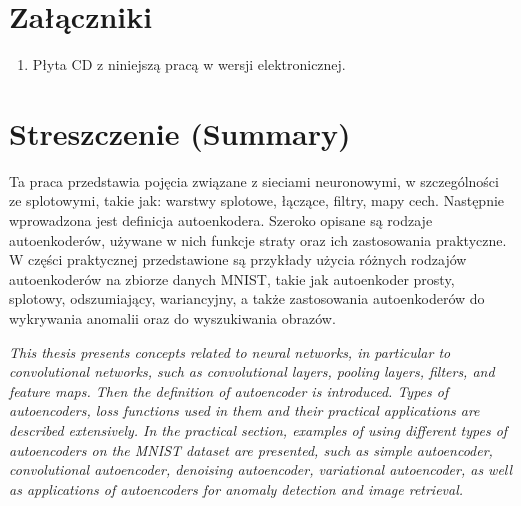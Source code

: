 \documentclass[12pt]{mwbk}
\theoremstyle{plain}
\theoremstyle{definition}
\theoremstyle{remark}
\begin{document}
\listoffigures

\listoftables


\chapter*{Załączniki}
\begin{enumerate}
\item Płyta CD z niniejszą pracą w wersji elektronicznej.
\end{enumerate}




\chapter*{Streszczenie (Summary)}

\bigskip
\bigskip

\begin{center}
  \textbf{\tytul}
\end{center}

Ta praca przedstawia pojęcia związane z sieciami neuronowymi, w szczególności ze splotowymi, takie jak: warstwy splotowe, łączące, filtry, mapy cech. Następnie wprowadzona jest definicja autoenkodera. Szeroko opisane są rodzaje autoenkoderów, używane w nich funkcje straty oraz ich zastosowania praktyczne. W części praktycznej przedstawione są przykłady użycia różnych rodzajów autoenkoderów na zbiorze danych MNIST, takie jak autoenkoder prosty, splotowy, odszumiający, wariancyjny, a także zastosowania autoenkoderów do wykrywania anomalii oraz do wyszukiwania obrazów.

\bigskip

\begin{center}
  \textbf{\textit{\tytulangielski}}
\end{center}



{\it
This thesis presents concepts related to neural networks, in particular to convolutional networks, such as convolutional layers, pooling layers, filters, and feature maps. Then the definition of autoencoder is introduced. Types of autoencoders, loss functions used in them and their practical applications are described extensively. In the practical section, examples of using different types of autoencoders on the MNIST dataset are presented, such as simple autoencoder, convolutional autoencoder, denoising autoencoder, variational autoencoder, as well as applications of autoencoders for anomaly detection and image retrieval.


}
\end{document}
